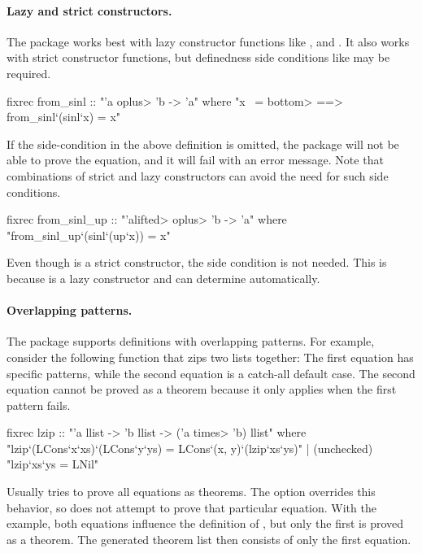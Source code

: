 \paragraph{Lazy and strict constructors.} The {\fixrec} package works best with lazy constructor functions like ,  and . It also works with strict constructor functions, but definedness side conditions like  may be required.
%
\begin{isacode}
fixrec from_sinl :: "'a \<oplus> 'b -> 'a"
  where "x ~= \<bottom> ==> from_sinl`(sinl`x) = x"
\end{isacode}
%
If the side-condition in the above definition is omitted, the {\fixrec} package will not be able to prove the equation, and it will fail with an error message. Note that combinations of strict and lazy constructors can avoid the need for such side conditions.
%
\begin{isacode}
fixrec from_sinl_up :: "'a\<lifted> \<oplus> 'b -> 'a"
  where "from_sinl_up`(sinl`(up`x)) = x"
\end{isacode}
%
Even though  is a strict constructor, the side condition  is not needed. This is because  is a lazy constructor and {\fixrec} can determine  automatically.

\paragraph{Overlapping patterns.} The {\fixrec} package supports definitions with overlapping patterns. For example, consider the following function that zips two lists together: The first equation has specific patterns, while the second equation is a catch-all default case. The second equation cannot be proved as a theorem because it only applies when the first pattern fails.
%
\begin{isacode}
fixrec lzip :: "'a llist -> 'b llist -> ('a \<times> 'b) llist"
  where "lzip`(LCons`x`xs)`(LCons`y`ys) = LCons`(x, y)`(lzip`xs`ys)"
  | (unchecked) "lzip`xs`ys = LNil"
\end{isacode}
%
Usually {\fixrec} tries to prove all equations as theorems. The  option overrides this behavior, so {\fixrec} does not attempt to prove that particular equation. With the  example, both equations influence the definition of , but only the first is proved as a theorem. The generated theorem list  then consists of only the first equation.

